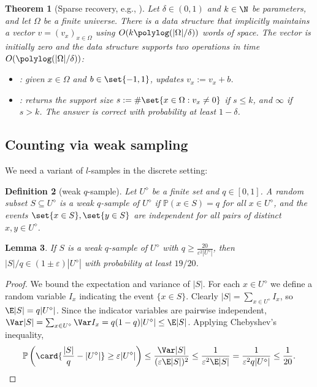 \documentclass[a4paper, 11pt]{article}
\newtheorem{theorem}{Theorem}[section]
\newtheorem{lemma}[theorem]{Lemma}
\newtheorem{definition}[theorem]{Definition}
\newcommand{\qedhere}{}
\newcommand{\eps}{\varepsilon}
\renewcommand{\Pr}{\mathbb{P}}
\newcommand{\discrete}[1]{#1^\diamond}
\begin{document}
\begin{theorem}[Sparse recovery, e.g., \cite{FrahlingIS08,JayaramWZ22}]
    \label{thm:sparse-recovery}
    Let $\delta \in (0,1)$ and $k \in \N$ be parameters, and let $\Omega$ be a finite universe. There is a data structure that implicitly maintains a vector $v = (v_x)_{x \in \Omega}$ using $O(k \polylog (|\Omega|/\delta))$ words of space. The vector is initially zero and the data structure supports two operations in time $O(\polylog (|\Omega|/\delta))$:
    \begin{itemize}
        \item {}: given $x \in \Omega$ and $b \in \set{-1,1}$, updates $v_x := v_x + b$.
        \item \support{}: returns the support size $s := \#\set{x \in \Omega: v_x \neq 0}$ if $s \leq k$, and $\infty$ if $s > k$. The answer is correct with probability at least $1-\delta$. 
    \end{itemize}
\end{theorem}

\subsection{Counting via weak sampling}
We need a variant of $l$-samples in the discrete setting:
\begin{definition}[weak $q$-sample]
    Let $\discrete{U}$ be a finite set and $q \in [0,1]$. A random subset $S \subseteq \discrete{U}$ is a \emph{weak $q$-sample} of $\discrete{U}$ if $\Pr(x \in S) = q$ for all $x \in \discrete{U}$, and the events $\set{x \in S}, \set{y \in S}$ are independent for all pairs of distinct $x,y \in \discrete{U}$.
\end{definition}

\begin{lemma}
    \label{lem:weak-sample}
    If $S$ is a weak $q$-sample of $\discrete{U}$ with $q \geq \frac{20}{\eps^2 |\discrete{U}|}$, then $|S|/q \in (1 \pm \eps) |\discrete{U}|$ with probability at least $19/20$.
\end{lemma}

\begin{proof}
    We bound the expectation and variance of $|S|$. For each $x \in \discrete{U}$ we define a random variable $I_x$ indicating the event $\{x \in S\}$. Clearly $|S| = \sum_{x \in \discrete{U}} I_x$, so $\E |S| = q|\discrete{U}|$. Since the indicator variables are pairwise independent, $\Var |S| = \sum_{x \in \discrete{U}} \Var I_x = q(1-q) |\discrete{U}| \leq \E |S|$. Applying Chebyshev's inequality,
    \[
        \Pr \left( \card{\frac{|S|}{q} - |\discrete{U}|} \geq \eps |\discrete{U}| \right)
        \leq \frac{\Var |S|}{(\eps \E |S|)^2}
        \leq \frac{1}{\eps^2 \E |S|}
        = \frac{1}{\eps^2 q|\discrete{U}|}
        \leq \frac{1}{20}. \qedhere
    \]
    \aftermath
\end{proof}
\end{document}
